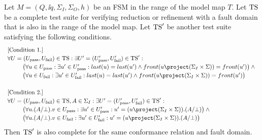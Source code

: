 \begin{theorem}\label{th:fsmT}
Let $M = (Q,\ii q, \Sigma_I,\Sigma_O,h)$ be an FSM in the range of the model map $T$. 
Let ${\text{TS}}$ be  a complete test suite for verifying reduction or refinement with a fault domain that is also in the range of the model map. Let ${\text{TS}}'$ be another test suite satisfying the following conditions.
\[
\def\arraystretch{1.2}
\begin{array}{l}
\text{[Condition~1.]}
\\
  \forall U = (\xpass U,\xfail U)\in\TS: \exists  U' = (\xpass U',\xfail U')\in\TS':
\\\tabc
\big( \forall u\in \xpass U: \exists u'\in \xpass U': 
 last(u) = last(u') \wedge front(u\project(\Sigma_I\times\Sigma)) = front(u')\big)
 \wedge {} 
 \\\tabc
 \big( \forall u\in \xfail U: \exists u'\in \xfail U': 
 last(u) = last(u') \wedge front(u\project(\Sigma_I\times\Sigma)) = front(u')\big)
 \\ {~}
 \\
 \text{[Condition~2.]}
\\
  \forall U = (\xpass U,\xfail U)\in\TS, A\in\Sigma_I: 
  \exists  U' = (\xpass U',\xfail U')\in\TS':
\\\tabc
\big( \forall u.(A/\bot).v\in \xpass U: \exists u'\in \xpass U': 
 u' = (u\project(\Sigma_I\times\Sigma)).(A/\bot)
 \big)
 \wedge {} 
 \\\tabc
\big( \forall u.(A/\bot).v\in \xfail U: \exists u'\in \xfail U': 
 u' = (u\project(\Sigma_I\times\Sigma)).(A/\bot)
 \big)
\end{array}
\def\arraystretch{1}
\]
Then ${\text{TS}}'$ is also complete for the same conformance relation and fault domain.
\end{theorem}
